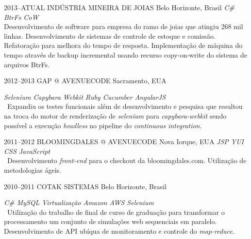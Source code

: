\documentclass[]{friggeri-cv}
\begin{document}
\begin{entrylist}


\entry
{2013--ATUAL}
{INDÚSTRIA MINEIRA DE JOIAS}
{Belo Horizonte, Brasil}
{\emph{\bullet C\# \bullet BtrFs CoW  } \\ Desenvolvimento de software para empresa do ramo de joias que atingiu 268 mil linhas. Desenvolvimento de sistemas de controle de estoque e comissão. Refatoração para melhora do tempo de resposta. Implementação de máquina do tempo através de backup incremental usando recurso copy-on-write do sistema de arquivos BtrFs. }


\entry
{2012--2013}
{GAP @ AVENUECODE}
{Sacramento, EUA}
{\emph{\bullet Selenium \bullet Capybara \bullet Webkit \bullet Ruby \bullet Cucumber \bullet AngularJS } \\
\
Expandiu os testes funcionais além de desenvolvimento e pesquisa que resultou na troca do motor de renderização de \textit{selenium} para \textit{capybara-webkit} sendo possível a execução \textit{headless} no pipeline do \textit{continuous integration}.%

}


\entry
{2011--2012}
{BLOOMINGDALES @ AVENUECODE}
{Nova Iorque, EUA}
{\emph{\bullet JSP \bullet YUI \bullet CSS \bullet JavaScript } \\
\
Desenvolvimento \textit{front-end} para o checkout da bloomingdales.com. Utilização de metodologias ágeis.
}

\entry
{2010--2011}
{COTAK SISTEMAS}
{Belo Horizonte, Brasil}
{\emph{\bullet C\# \bullet MySQL \bullet Virtualização \bullet Amazon AWS \bullet Selenium } \\
\
Utilização do trabalho de final de curso de graduação para transformar o processamento um conjunto de simulações web sequenciais em paralelo. Desenvolvimento de API ubíqua de monitoramento e controle do \textit{map-reduce}.

}




\end{entrylist}
\end{document}
